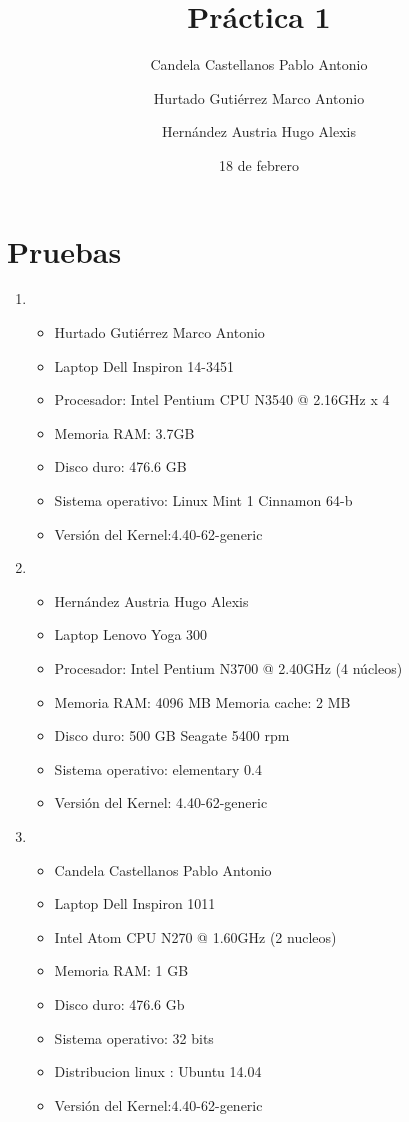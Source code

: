 \documentclass[11pt,letterpaper]{article}
\title{Práctica 1}
\author{Candela Castellanos Pablo Antonio\\
\and Hurtado Gutiérrez Marco Antonio\\ 
\and Hernández Austria Hugo Alexis\\}
\date{18 de febrero}
\begin{document}
\maketitle

\section{Pruebas}

\begin{enumerate}
\item
\begin{itemize}
\item
Hurtado Gutiérrez Marco Antonio
\item
Laptop Dell Inspiron 14-3451
\item
Procesador: Intel Pentium CPU N3540  @ 2.16GHz x 4 
\item
Memoria RAM: 3.7GB
\item
Disco duro: 476.6 GB
\item
Sistema operativo: Linux Mint 1 Cinnamon 64-b
\item
Versión del Kernel:4.40-62-generic
\end{itemize}

\item
\begin{itemize}
\item
Hernández Austria Hugo Alexis
\item
Laptop Lenovo Yoga 300
\item
Procesador: Intel Pentium N3700 @ 2.40GHz (4 núcleos) 
\item
Memoria RAM: 4096 MB Memoria cache: 2 MB
\item
Disco duro: 500 GB Seagate 5400 rpm
\item
Sistema operativo: elementary 0.4
\item
Versión del Kernel: 4.40-62-generic
\end{itemize}



\item
\begin{itemize}
\item
Candela Castellanos Pablo Antonio
\item
Laptop Dell Inspiron 1011
\item
Intel Atom CPU N270 @ 1.60GHz (2 nucleos)  
\item
Memoria RAM: 1 GB
\item
Disco duro: 476.6 Gb
\item
Sistema operativo: 32 bits
\item
Distribucion linux : Ubuntu 14.04
\item
Versión del Kernel:4.40-62-generic
\end{itemize}
\end{enumerate}
\end{document}
